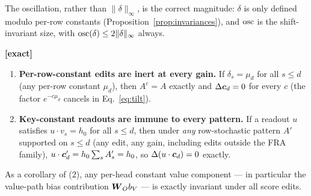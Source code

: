 \documentclass{article}
\begin{document}
\begin{remark}
The oscillation, rather than $\|\delta\|_\infty$, is the correct magnitude: $\delta$ is only defined modulo per-row constants (Proposition~\ref{prop:invariances}), and $\operatorname{osc}$ is the shift-invariant size, with $\operatorname{osc}(\delta) \le 2\|\delta\|_\infty$ always.
\end{remark}

\begin{prop}\label{prop:invariances}
\textbf{[exact]}
\begin{enumerate}
    \item \textbf{Per-row-constant edits are inert at every gain.} If $\delta_s = \mu_d$ for all $s \le d$ (any per-row constant $\mu_d$), then $A^c = A$ exactly and $\Delta\boldsymbol{c}_d = 0$ for every $c$ (the factor $e^{-c\mu_d}$ cancels in Eq.~\eqref{eq:tilt}).
    \item \textbf{Key-constant readouts are immune to every pattern.} If a readout $u$ satisfies $u\cdot v_s = h_0$ for all $s \le d$, then under \emph{any} row-stochastic pattern $A'$ supported on $s \le d$ (any edit, any gain, including edits outside the FRA family), $u\cdot\boldsymbol{c}_d' = h_0\sum_s A_s' = h_0$, so $\Delta(u\cdot\boldsymbol{c}_d) = 0$ exactly.
\end{enumerate}
As a corollary of (2), any per-head constant value component --- in particular the value-path bias contribution $\boldsymbol{W}_O b_V$ --- is exactly invariant under all score edits.
\end{prop}
\end{document}
